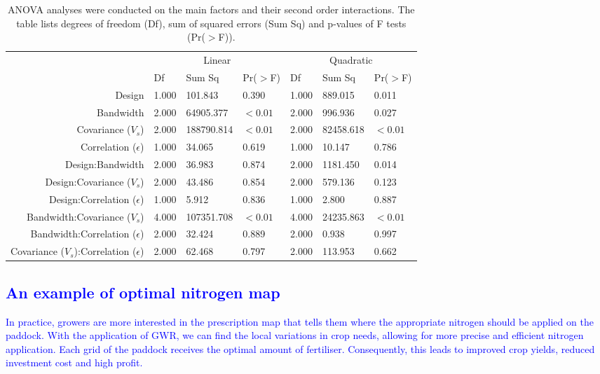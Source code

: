 \documentclass[a4paper]{article} 	%
\newcommand{\zc}[1]{\textcolor{blue}{#1}}
\begin{document}
\begin{table}[!htp]
\centering
\caption{ANOVA analyses were conducted on the main factors and their second order interactions. The table lists degrees of freedom (Df), sum of squared errors (Sum Sq) and p-values of F tests (Pr($>$F)).}\label{tb:LMMoutput}
\begin{tabular}{r | lll | lll} \toprule
		& \multicolumn{3}{c|}{Linear}  & \multicolumn{3}{c}{Quadratic}  \\
	  & Df & Sum Sq & Pr($>$F) & Df & Sum Sq & Pr($>$F) \\ \midrule
Design   & 1.000 & 101.843 & 0.390 & 1.000 & 889.015 & 0.011 \\ 
Bandwidth  & 2.000 & 64905.377 & $<0.01$ & 2.000 & 996.936 & 0.027 \\ 
Covariance ($V_s$) & 2.000 & 188790.814 & $<0.01$ & 2.000 & 82458.618 & $<0.01$ \\ 
Correlation ($\epsilon$) & 1.000 & 34.065 & 0.619 & 1.000 & 10.147 & 0.786 \\ 
Design:Bandwidth & 2.000 & 36.983 & 0.874 & 2.000 & 1181.450 & 0.014 \\ 
Design:Covariance ($V_s$)       & 2.000 & 43.486 & 0.854 & 2.000 & 579.136 & 0.123 \\ 
Design:Correlation ($\epsilon$) & 1.000 & 5.912 & 0.836 & 1.000 & 2.800 & 0.887 \\ 
Bandwidth:Covariance ($V_s$)  & 4.000 & 107351.708 & $<0.01$ & 4.000 & 24235.863 & $<0.01$ \\ 
Bandwidth:Correlation ($\epsilon$)    & 2.000 & 32.424 & 0.889 & 2.000 & 0.938 & 0.997 \\ 
Covariance ($V_s$):Correlation ($\epsilon$)          & 2.000 & 62.468 & 0.797 & 2.000 & 113.953 & 0.662 \\ 
		\bottomrule
\end{tabular}
\end{table}



\subsection{\zc{An example of optimal nitrogen map}}


\zc{In practice, growers are more interested in the prescription map that tells them where the appropriate nitrogen should be applied on the paddock. With the application of GWR, we can find the local variations in crop needs, allowing for more precise and efficient nitrogen application. Each grid of the paddock receives the optimal amount of fertiliser. Consequently, this leads to improved crop yields, reduced investment cost and high profit.}
\end{document}
